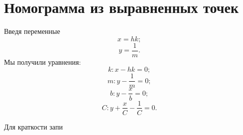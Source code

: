 \section{Номограмма из выравненных точек}

Введя переменные 
$$x = hk;$$
$$y = \frac{1}{m}.$$
Мы получили уравнения: 
$$k: x - hk = 0;$$
$$m: y - \frac{1}{m} = 0;$$
$$b: y - \frac{x}{b} = 0;$$
$$C: y + \frac{x}{C} - \frac{1}{C} =0.$$

Для краткости запи